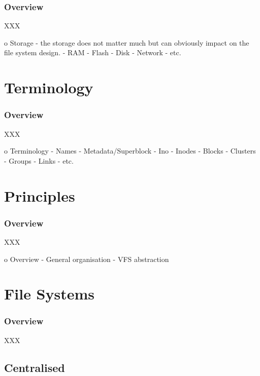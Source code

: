 
\begin{frame}
  \frametitle{Overview}

  XXX
\end{frame}

o Storage
 - the storage does not matter much but can obviously impact on the file system design.
   - RAM
   - Flash
   - Disk
   - Network
   - etc.

%
%

\section{Terminology}


\begin{frame}
  \frametitle{Overview}

  XXX
\end{frame}

o Terminology
  - Names
  - Metadata/Superblock
  - Ino
  - Inodes
  - Blocks
  - Clusters
  - Groups
  - Links
  - etc.

%
%

\section{Principles}


\begin{frame}
  \frametitle{Overview}

  XXX
\end{frame}

o Overview
  - General organisation
  - VFS abstraction

%
%

\section{File Systems}


\begin{frame}
  \frametitle{Overview}

  XXX
\end{frame}


\subsection{Centralised}

